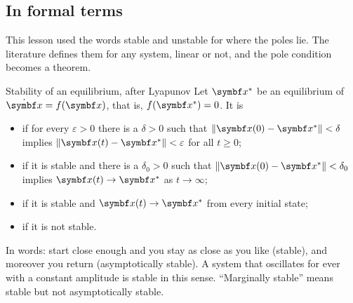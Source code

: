 \subsection{In formal terms}
This lesson used the words stable and unstable for where the poles lie. The literature defines them for any system, linear or not, and the pole condition becomes a theorem.

\begin{definition}{Stability of an equilibrium, after Lyapunov}
Let $\vx^*$ be an equilibrium of $\dot{\vx} = f(\vx)$, that is, $f(\vx^*) = 0$. It is
\begin{itemize}
  \item {} if for every $\varepsilon > 0$ there is a $\delta > 0$ such that $\|\vx(0) - \vx^*\| < \delta$ implies $\|\vx(t) - \vx^*\| < \varepsilon$ for all $t \ge 0$;
  \item {} if it is stable and there is a $\delta_0 > 0$ such that $\|\vx(0) - \vx^*\| < \delta_0$ implies $\vx(t) \to \vx^*$ as $t \to \infty$;
  \item {} if it is stable and $\vx(t) \to \vx^*$ from every initial state;
  \item {} if it is not stable.
\end{itemize}
\end{definition}

In words: start close enough and you stay as close as you like (stable), and moreover you return (asymptotically stable). A system that oscillates for ever with a constant amplitude is stable in this sense. \enquote{Marginally stable} means stable but not asymptotically stable.

